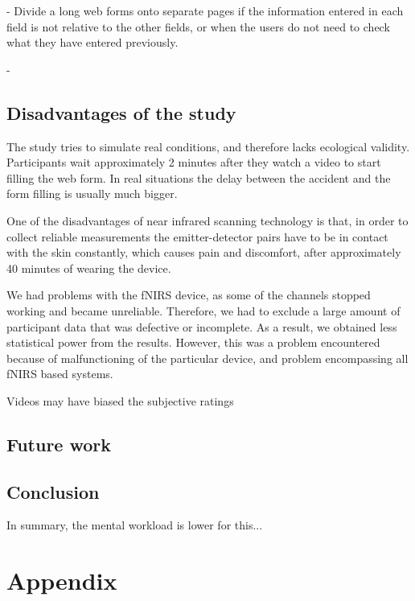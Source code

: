 \documentclass[a4paper]{report}
\begin{document}
		- Divide a long web forms onto separate pages if the information entered in each field is not relative to the other fields, or when the users do not need to check what they have entered previously.
		
		-
		
	\section{Disadvantages of the study}
		The study tries to simulate real conditions, and therefore lacks ecological validity. Participants wait approximately 2 minutes after they watch a video to start filling the web form. In real situations the delay between the accident and the form filling is usually much bigger. 
		
		One of the disadvantages of near infrared scanning technology is that, in order to collect reliable measurements the emitter-detector pairs have to be in contact with the skin constantly, which causes pain and discomfort, after approximately 40 minutes of wearing the device.
		
		We had problems with the fNIRS device, as some of the channels stopped working and became unreliable. Therefore, we had to exclude a large amount of participant data that was defective or incomplete. As a result, we obtained less statistical power from the results. However, this was a problem encountered because of malfunctioning of the particular device, and problem encompassing all fNIRS based systems.
		
		Videos may have biased the subjective ratings
		
	\section{Future work}
		
	\section{Conclusion}
		In summary, the mental workload is lower for this...
	
	
\chapter*{Appendix}
\end{document}
